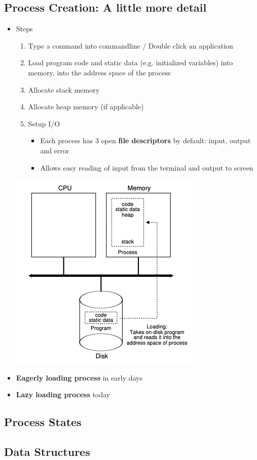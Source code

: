 \documentclass[12pt]{article}
\begin{document}
\subsection{Process Creation: A little more detail}


\begin{itemize}
    \item Steps
    \begin{enumerate}[1.]
        \item Type a command into commandline / Double click an application
        \item Load program code and static data (e.g. initialized variables) into
        memory, into the address space of the process
        \item Allocate stack memory
        \item Allocate heap memory (if applicable)
        \item Setup I/O
        \begin{itemize}
            \item Each process has 3 open \textbf{file descriptors} by default:
            input, output and error
            \item Allows easy reading of input from the terminal and output to screen
        \end{itemize}
    \end{enumerate}

    \begin{center}
    \includegraphics[width=0.4\linewidth]{images/notes_4_6.png}
    \end{center}

    \item \textbf{Eagerly loading process} in early days
    \item \textbf{Lazy loading process} today
\end{itemize}
\subsection{Process States}
\subsection{Data Structures}
\end{document}
